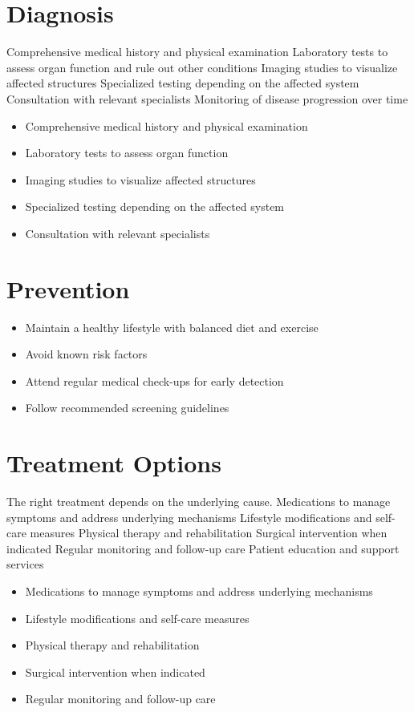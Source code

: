 \section{Diagnosis}
Comprehensive medical history and physical examination Laboratory tests to assess organ function and rule out other conditions Imaging studies to visualize affected structures Specialized testing depending on the affected system Consultation with relevant specialists Monitoring of disease progression over time

\begin{itemize}[noitemsep]
  \item Comprehensive medical history and physical examination
  \item Laboratory tests to assess organ function
  \item Imaging studies to visualize affected structures
  \item Specialized testing depending on the affected system
  \item Consultation with relevant specialists
\end{itemize}
\section{Prevention}
\begin{itemize}[noitemsep]
  \item Maintain a healthy lifestyle with balanced diet and exercise
  \item Avoid known risk factors
  \item Attend regular medical check-ups for early detection
  \item Follow recommended screening guidelines
\end{itemize}
\section{Treatment Options}
The right treatment depends on the underlying cause. Medications to manage symptoms and address underlying mechanisms Lifestyle modifications and self-care measures Physical therapy and rehabilitation Surgical intervention when indicated Regular monitoring and follow-up care Patient education and support services

\begin{itemize}[noitemsep]
  \item Medications to manage symptoms and address underlying mechanisms
  \item Lifestyle modifications and self-care measures
  \item Physical therapy and rehabilitation
  \item Surgical intervention when indicated
  \item Regular monitoring and follow-up care
\end{itemize}
